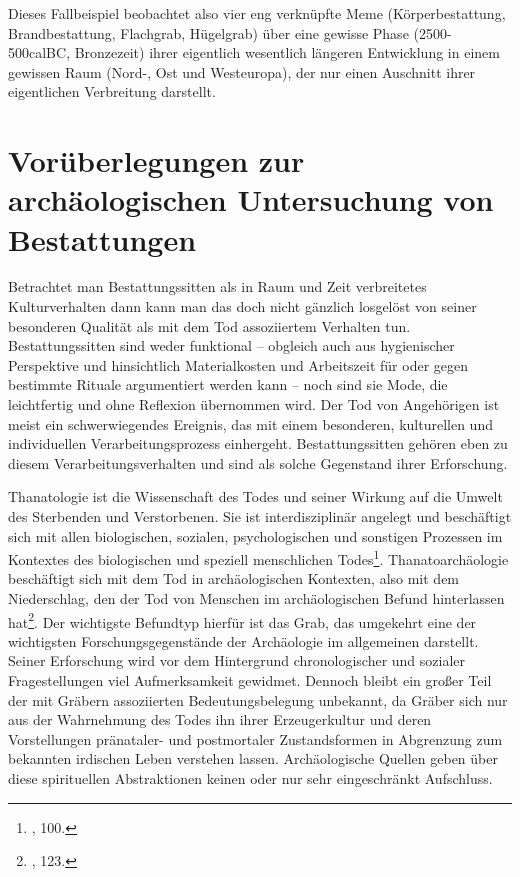 \documentclass[openany,twoside,twocolumn]{book}
\let\rmarkdownfootnote\footnote%
\def\footnote{\protect\rmarkdownfootnote}
\begin{document}
Dieses Fallbeispiel beobachtet also vier eng verknüpfte Meme
(Körperbestattung, Brandbestattung, Flachgrab, Hügelgrab) über eine
gewisse Phase (2500-500calBC, Bronzezeit) ihrer eigentlich wesentlich
längeren Entwicklung in einem gewissen Raum (Nord-, Ost und Westeuropa),
der nur einen Auschnitt ihrer eigentlichen Verbreitung darstellt.

\hypertarget{voruberlegungen-zur-archaologischen-untersuchung-von-bestattungen}{%
\section{Vorüberlegungen zur archäologischen Untersuchung von
Bestattungen}\label{voruberlegungen-zur-archaologischen-untersuchung-von-bestattungen}}

Betrachtet man Bestattungssitten als in Raum und Zeit verbreitetes
Kulturverhalten dann kann man das doch nicht gänzlich losgelöst von
seiner besonderen Qualität als mit dem Tod assoziiertem Verhalten tun.
Bestattungssitten sind weder funktional -- obgleich auch aus
hygienischer Perspektive und hinsichtlich Materialkosten und Arbeitszeit
für oder gegen bestimmte Rituale argumentiert werden kann -- noch sind
sie Mode, die leichtfertig und ohne Reflexion übernommen wird. Der Tod
von Angehörigen ist meist ein schwerwiegendes Ereignis, das mit einem
besonderen, kulturellen und individuellen Verarbeitungsprozess
einhergeht. Bestattungssitten gehören eben zu diesem
Verarbeitungsverhalten und sind als solche Gegenstand ihrer Erforschung.

Thanatologie ist die Wissenschaft des Todes und seiner Wirkung auf die
Umwelt des Sterbenden und Verstorbenen. Sie ist interdisziplinär
angelegt und beschäftigt sich mit allen biologischen, sozialen,
psychologischen und sonstigen Prozessen im Kontextes des biologischen
und speziell menschlichen Todes\footnote{\textcite{hofmann_rituelle_2008},
  100.}. Thanatoarchäologie beschäftigt sich mit dem Tod in
archäologischen Kontexten, also mit dem Niederschlag, den der Tod von
Menschen im archäologischen Befund hinterlassen hat\footnote{\textcite{hofmann_rituelle_2008},
  123.}. Der wichtigste Befundtyp hierfür ist das Grab, das umgekehrt
eine der wichtigsten Forschungsgegenstände der Archäologie im
allgemeinen darstellt. Seiner Erforschung wird vor dem Hintergrund
chronologischer und sozialer Fragestellungen viel Aufmerksamkeit
gewidmet. Dennoch bleibt ein großer Teil der mit Gräbern assoziierten
Bedeutungsbelegung unbekannt, da Gräber sich nur aus der Wahrnehmung des
Todes ihn ihrer Erzeugerkultur und deren Vorstellungen pränataler- und
postmortaler Zustandsformen in Abgrenzung zum bekannten irdischen Leben
verstehen lassen. Archäologische Quellen geben über diese spirituellen
Abstraktionen keinen oder nur sehr eingeschränkt Aufschluss.
\end{document}
